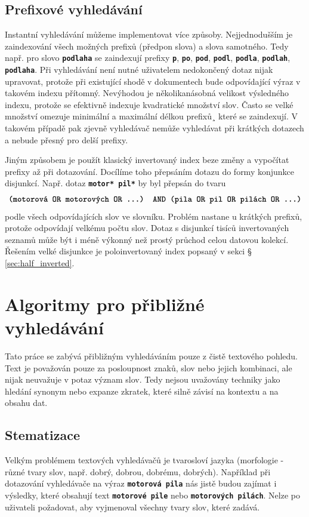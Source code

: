 \documentclass[11pt,letterpaper,oneside,openright]{book}
\newcommand{\bftt}[1]{\texttt{\textbf{#1}}}
\begin{document}
\subsection{Prefixové vyhledávání} \label{sec:prefix_search}
Instantní vyhledávání můžeme implementovat více způsoby. Nejjednodušším je
zaindexování všech možných prefixů (předpon slova) a slova samotného. Tedy
např. pro slovo \bftt{podlaha} se zaindexují prefixy \bftt{p}, \bftt{po},
\bftt{pod}, \bftt{podl}, \bftt{podla}, \bftt{podlah}, \bftt{podlaha}. Při
vyhledávání není nutné uživatelem nedokončený dotaz nijak upravovat, protože
při existující shodě v dokumentech bude odpovídající výraz v takovém indexu
přítomný. Nevýhodou je několikanásobná velikost výsledného indexu, protože se
efektivně indexuje kvadratické množství slov. Často se velké množství omezuje
minimální a maximální délkou prefixů¸ které se zaindexují. V takovém případě
pak zjevně vyhledávač nemůže vyhledávat při krátkých dotazech a nebude přesný
pro delší prefixy.

Jiným způsobem je použít klasický invertovaný index beze změny a vypočítat
prefixy až při dotazování. Docílíme toho přepsáním dotazu do formy konjunkce
disjunkcí. Např. dotaz \bftt{motor* pil*} by byl přepsán do tvaru
\[\bftt{(motorová OR motorových OR ...) AND (pila OR pil OR pilách OR ...)}\]
podle všech odpovídajících slov ve slovníku. Problém nastane u krátkých
prefixů, protože odpovídají velkému počtu slov. Dotaz s disjunkcí tisíců
invertovaných seznamů může být i méně výkonný než prostý průchod celou datovou
kolekcí. Řešením velké disjunkce je poloinvertovaný index popsaný v sekci
\S\,\ref{sec:half_inverted}.

\section{Algoritmy pro přibližné vyhledávání}
Tato práce se zabývá přibližným vyhledáváním pouze z čistě textového pohledu.
Text je považován pouze za posloupnost znaků, slov nebo jejich kombinaci, ale
nijak neuvažuje v potaz význam slov. Tedy nejsou uvažovány techniky jako
hledání synonym nebo expanze zkratek, které silně závisí na kontextu a na
obsahu dat.

\subsection{Stematizace}
Velkým problémem textových vyhledávačů je tvarosloví jazyka (morfologie - různé
tvary slov, např. dobrý, dobrou, dobrému, dobrých). Například při dotazování
vyhledávače na výraz \bftt{motorová pila} nás jistě budou zajímat i výsledky,
které obsahují text \bftt{motorové pile} nebo \bftt{motorových pilách}. Nelze
po uživateli požadovat, aby vyjmenoval všechny tvary slov, které zadává.
\end{document}
